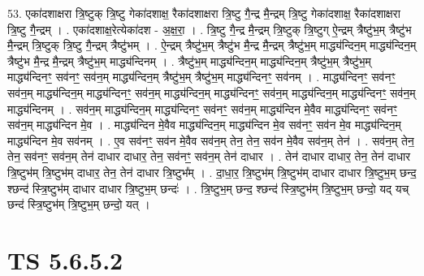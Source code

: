 \documentclass[17pt]{extarticle}
\begin{document}
53. एका॑दशाक्षरा त्रि॒ष्टुक् त्रि॒ष्टु गेका॑दशाक्ष॒ रैका॑दशाक्षरा त्रि॒ष्टु गै॒न्द्र मै॒न्द्रम् त्रि॒ष्टु गेका॑दशाक्ष॒ रैका॑दशाक्षरा त्रि॒ष्टु गै॒न्द्रम् । . एका॑दशाक्ष॒रेत्येका॑दश - अ॒क्ष॒रा॒ । . त्रि॒ष्टु गै॒न्द्र मै॒न्द्रम् त्रि॒ष्टुक् त्रि॒ष्टुग् ऐ॒न्द्रम् त्रैष्टु॑भ॒म् त्रैष्टु॑भ मै॒न्द्रम् त्रि॒ष्टुक् त्रि॒ष्टु गै॒न्द्रम् त्रैष्टु॑भम् । . ऐ॒न्द्रम् त्रैष्टु॑भ॒म् त्रैष्टु॑भ मै॒न्द्र मै॒न्द्रम् त्रैष्टु॑भ॒म् माद्ध्य॑न्दिन॒म् माद्ध्य॑न्दिन॒म् त्रैष्टु॑भ मै॒न्द्र मै॒न्द्रम् त्रैष्टु॑भ॒म् माद्ध्य॑न्दिनम् । . त्रैष्टु॑भ॒म् माद्ध्य॑न्दिन॒म् माद्ध्य॑न्दिन॒म् त्रैष्टु॑भ॒म् त्रैष्टु॑भ॒म् माद्ध्य॑न्दिनꣳ॒॒ सव॑नꣳ॒॒ सव॑न॒म् माद्ध्य॑न्दिन॒म् त्रैष्टु॑भ॒म् त्रैष्टु॑भ॒म् माद्ध्य॑न्दिनꣳ॒॒ सव॑नम् । . माद्ध्य॑न्दिनꣳ॒॒ सव॑नꣳ॒॒ सव॑न॒म् माद्ध्य॑न्दिन॒म् माद्ध्य॑न्दिनꣳ॒॒ सव॑न॒म् माद्ध्य॑न्दिन॒म् माद्ध्य॑न्दिनꣳ॒॒ सव॑न॒म् माद्ध्य॑न्दिन॒म् माद्ध्य॑न्दिनꣳ॒॒ सव॑न॒म् माद्ध्य॑न्दिनम् । . सव॑न॒म् माद्ध्य॑न्दिन॒म् माद्ध्य॑न्दिनꣳ॒॒ सव॑नꣳ॒॒ सव॑न॒म् माद्ध्य॑न्दिन मे॒वैव माद्ध्य॑न्दिनꣳ॒॒ सव॑नꣳ॒॒ सव॑न॒म् माद्ध्य॑न्दिन मे॒व । . माद्ध्य॑न्दिन मे॒वैव माद्ध्य॑न्दिन॒म् माद्ध्य॑न्दिन मे॒व सव॑नꣳ॒॒ सव॑न मे॒व माद्ध्य॑न्दिन॒म् माद्ध्य॑न्दिन मे॒व सव॑नम् । . ए॒व सव॑नꣳ॒॒ सव॑न मे॒वैव सव॑न॒म् तेन॒ तेन॒ सव॑न मे॒वैव सव॑न॒म् तेन॑ । . सव॑न॒म् तेन॒ तेन॒ सव॑नꣳ॒॒ सव॑न॒म् तेन॑ दाधार दाधार॒ तेन॒ सव॑नꣳ॒॒ सव॑न॒म् तेन॑ दाधार । . तेन॑ दाधार दाधार॒ तेन॒ तेन॑ दाधार त्रि॒ष्टुभ॑म् त्रि॒ष्टुभ॑म् दाधार॒ तेन॒ तेन॑ दाधार त्रि॒ष्टुभ᳚म् । . दा॒धा॒र॒ त्रि॒ष्टुभ॑म् त्रि॒ष्टुभ॑म् दाधार दाधार त्रि॒ष्टुभ॒म् छन्द॒ श्छन्द॑ स्त्रि॒ष्टुभ॑म् दाधार दाधार त्रि॒ष्टुभ॒म् छन्दः॑ । . त्रि॒ष्टुभ॒म् छन्द॒ श्छन्द॑ स्त्रि॒ष्टुभ॑म् त्रि॒ष्टुभ॒म् छन्दो॒ यद् यच् छन्द॑ स्त्रि॒ष्टुभ॑म् त्रि॒ष्टुभ॒म् छन्दो॒ यत् । \newline
\pagebreak
{}

\section{ TS 5.6.5.2 }
\end{document}
